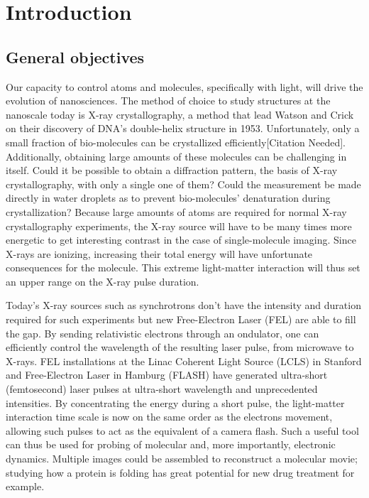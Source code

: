 \section{Introduction}


\subsection{General objectives}

Our capacity to control atoms and molecules, specifically with light,
will drive the evolution of nanosciences. The method of choice to study
structures at the nanoscale today is X-ray crystallography, a method that lead
Watson and Crick on their discovery of DNA's double-helix structure in 1953.
Unfortunately, only a small fraction of bio-molecules can be crystallized
efficiently[Citation Needed]. Additionally, obtaining large amounts of these
molecules can be challenging in itself\cite{Young2010}. Could it be
possible to obtain a diffraction pattern,
the basis of X-ray crystallography, with only a single one of them? Could the
measurement be made directly in water droplets as to prevent bio-molecules'
denaturation during crystallization? Because large amounts of atoms are
required for normal X-ray crystallography experiments, the X-ray source will
have to be many times more energetic to get interesting contrast in the
case of single-molecule imaging. Since X-rays are ionizing, increasing their
total energy will have unfortunate consequences for the molecule. This
extreme light-matter interaction will thus set an upper range on the X-ray
pulse duration.

Today's X-ray sources such as synchrotrons don't have the intensity and
duration required for such experiments but new Free-Electron Laser (FEL) are
able to fill the gap. By sending relativistic electrons through an ondulator,
one can efficiently control the wavelength of the resulting laser pulse, from
microwave to X-rays. FEL installations at the Linac Coherent Light Source
(LCLS) in Stanford and Free-Electron Laser in Hamburg (FLASH) have generated
ultra-short (femtosecond) laser pulses at ultra-short wavelength and
unprecedented intensities. By concentrating the energy during a short pulse,
the light-matter interaction time scale is now on the same order as the
electrons movement, allowing such pulses to act as the equivalent of a camera
flash. Such a useful tool can thus be used for probing of molecular
and, more importantly, electronic dynamics\cite{Chapman2011}. Multiple
images could be assembled
to reconstruct a molecular movie; studying how a protein is folding has great
potential for new drug treatment for example.

